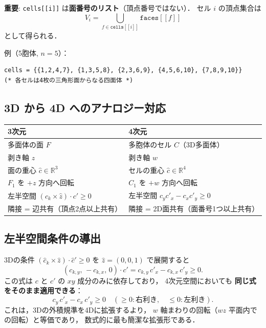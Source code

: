 \documentclass[12pt,a4paper]{article}
\theoremstyle{definition}
\begin{document}
\noindent \textbf{重要}: \texttt{cells[[i]]} は\textbf{面番号のリスト}（頂点番号ではない）．
セル $i$ の頂点集合は
\begin{equation}
  V_i = \bigcup_{f \in \texttt{cells}[[i]]} \texttt{faces}[[f]]
\end{equation}
として得られる．

例（5胞体, $n=5$）：
\begin{lstlisting}
cells = {{1,2,4,7}, {1,3,5,8}, {2,3,6,9}, {4,5,6,10}, {7,8,9,10}}
(* 各セルは4枚の三角形面からなる四面体 *)
\end{lstlisting}

\subsection{3D から 4D へのアナロジー対応}

\begin{center}
\begin{tabular}{ll}
\toprule
3次元 & 4次元 \\
\midrule
多面体の面 $F$ & 多胞体のセル $C$（3D多面体） \\
剥き軸 $z$ & 剥き軸 $w$ \\
面の重心 $\hat{c} \in \mathbb{R}^3$ & セルの重心 $\hat{c} \in \mathbb{R}^4$ \\
$F_1$ を $+z$ 方向へ回転 & $C_1$ を $+w$ 方向へ回転 \\
左半空間 $(c_k \times \hat{z}) \cdot c' \geq 0$ & 左半空間 $c_y c'_x - c_x c'_y \geq 0$ \\
隣接 = 辺共有（頂点2点以上共有） & 隣接 = 2D面共有（面番号1つ以上共有） \\
\bottomrule
\end{tabular}
\end{center}

\subsection{左半空間条件の導出}

3Dの条件 $(\hat{c}_k \times \hat{z}) \cdot \hat{c}' \geq 0$ を $\hat{z} = (0,0,1)$ で展開すると
\[
  (c_{k,y},\, -c_{k,x},\, 0) \cdot c' = c_{k,y}\,c'_x - c_{k,x}\,c'_y \geq 0.
\]
この式は $c$ と $c'$ の $xy$ 成分のみに依存しており，
4次元空間においても \textbf{同じ式をそのまま適用できる}：
\[
  \boxed{c_y\,c'_x - c_x\,c'_y \geq 0}
  \quad (\geq 0 : \text{右利き},\quad \leq 0 : \text{左利き}).
\]
これは，3Dの外積規準を4Dに拡張するより，
$w$ 軸まわりの回転（$wz$ 平面内での回転）と等価であり，
数式的に最も簡潔な拡張形である．
\end{document}
